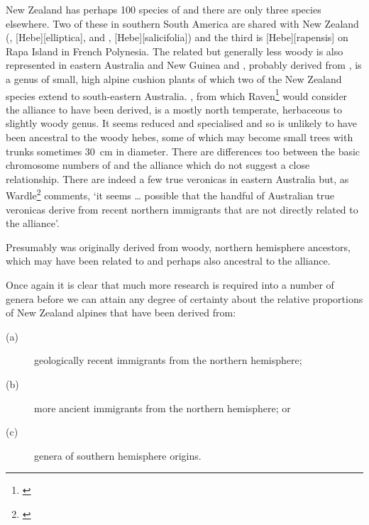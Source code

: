 New Zealand has perhaps 100 species of  and there are only three species elsewhere.
Two of these in southern South America are shared with New Zealand (, [Hebe][elliptica], and , [Hebe][salicifolia]) and the third is [Hebe][rapensis] on Rapa Island in French Polynesia.
The related but generally less woody  is also represented in eastern Australia and New Guinea and , probably derived from , is a genus of small, high alpine cushion plants of which two of the New Zealand species extend to south-eastern Australia.
, from which Raven\footnote{\cite{raven1973evolution}} would consider the  alliance to have been derived, is a mostly north temperate, herbaceous to slightly woody genus.
It seems reduced and specialised and so is unlikely to have been ancestral to the woody hebes, some of which may become small trees with trunks sometimes \SI{30}{\centi\metre} in diameter.
There are differences too between the basic chromosome numbers of  and the  alliance which do not suggest a close relationship.
There are indeed a few true veronicas in eastern Australia but, as Wardle\footnote{\cite{wardle1978origin}} comments, `it seems … possible that the handful of Australian true veronicas derive from recent northern immigrants that are not directly related to the  alliance'.

Presumably  was originally derived from woody, northern hemisphere ancestors, which may have been related to and perhaps also ancestral to the  alliance.

Once again it is clear that much more research is required into a number of genera before we can attain any degree of certainty about the relative proportions of New Zealand alpines that have been derived from:

\begin{description}
	\item[{(a)}]geologically recent immigrants from the northern hemisphere;
	\item[{(b)}]more ancient immigrants from the northern hemisphere; or
	\item[{(c)}]genera of southern hemisphere origins.
\end{description}
